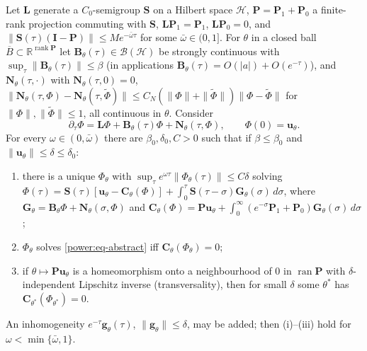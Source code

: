 \begin{lemma}
\label{power:lem-lower-order}
Let $\mathbf L$ generate a $C_0$-semigroup $\mathbf S$ on a Hilbert space $\mathcal H$,
$\mathbf P=\mathbf P_1+\mathbf P_0$ a finite-rank projection commuting with $\mathbf S$,
$\mathbf L\mathbf P_1=\mathbf P_1$, $\mathbf L\mathbf P_0=0$, and
$\|\mathbf S(\tau)(\mathbf I-\mathbf P)\|\le Me^{-\bar\omega\tau}$ for some $\bar\omega\in(0,1]$. For
$\theta$ in a closed ball $\overline B\subset\mathbb R^{\operatorname{rank}\mathbf P}$ let
$\mathbf B_\theta(\tau)\in\mathcal B(\mathcal H)$ be strongly continuous with
$\sup_\tau\|\mathbf B_\theta(\tau)\|\le\beta$ (in applications
$\mathbf B_\theta(\tau)=O(|a|)+O(e^{-\tau})$), and $\mathbf N_\theta(\tau,\cdot)$ with
$\mathbf N_\theta(\tau,0)=0$,
$\|\mathbf N_\theta(\tau,\Phi)-\mathbf N_\theta(\tau,\tilde\Phi)\|\le C_N(\|\Phi\|+\|\tilde\Phi\|)\|\Phi-\tilde\Phi\|$
for $\|\Phi\|,\|\tilde\Phi\|\le1$, all continuous in $\theta$. Consider
\begin{equation}\label{power:eq-abstract}
  \partial_\tau\Phi=\mathbf L\Phi+\mathbf B_\theta(\tau)\Phi+\mathbf N_\theta(\tau,\Phi),\qquad\Phi(0)=\mathbf u_\theta .
\end{equation}
For every $\omega\in(0,\bar\omega)$ there are $\beta_0,\delta_0,C>0$ such that if $\beta\le\beta_0$ and
$\|\mathbf u_\theta\|\le\delta\le\delta_0$:
\begin{enumerate}[nosep,label=(\roman*)]
\item there is a unique $\Phi_\theta$ with $\sup_\tau e^{\omega\tau}\|\Phi_\theta(\tau)\|\le
  C\delta$ solving
  $\Phi(\tau)=\mathbf S(\tau)[\mathbf u_\theta-\mathbf C_\theta(\Phi)]+\int_0^\tau\mathbf S(\tau-\sigma)\mathbf G_\theta(\sigma)\,d\sigma$,
  where $\mathbf G_\theta=\mathbf B_\theta\Phi+\mathbf N_\theta(\sigma,\Phi)$ and
  $\mathbf C_\theta(\Phi)=\mathbf P\mathbf u_\theta+\int_0^\infty(e^{-\sigma}\mathbf P_1+\mathbf P_0)\mathbf G_\theta(\sigma)\,d\sigma$;
\item $\Phi_\theta$ solves \eqref{power:eq-abstract} iff $\mathbf C_\theta(\Phi_\theta)=0$;
\item if $\theta\mapsto\mathbf P\mathbf u_\theta$ is a homeomorphism onto a neighbourhood of
  $0$ in $\operatorname{ran}\mathbf P$ with $\delta$-independent Lipschitz inverse
  (transversality), then for small $\delta$ some $\theta^*$ has
  $\mathbf C_{\theta^*}(\Phi_{\theta^*})=0$.
\end{enumerate}
An inhomogeneity $e^{-\tau}\mathbf g_\theta(\tau)$, $\|\mathbf g_\theta\|\le\delta$, may be
added; then (i)--(iii) hold for $\omega<\min\{\bar\omega,1\}$.
\end{lemma}
